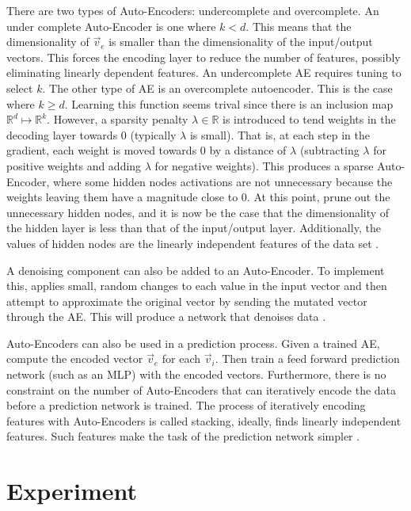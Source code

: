 \documentclass[twoside,11pt]{article}
\begin{document}
	There are two types of Auto-Encoders: undercomplete and overcomplete. 
	An under complete Auto-Encoder is one where $k < d$. This means that the dimensionality of $\vec{v}_e$ is smaller than the dimensionality of the input/output vectors. 
	This forces the encoding layer to reduce the number of features, possibly eliminating linearly dependent features. 
	An undercomplete AE requires tuning to select $k$.
	The other type of AE is an overcomplete autoencoder. This is the case where $k \geq d$.
	Learning this function seems trival since there is an inclusion map $\mathbb{R}^d \mapsto \mathbb{R}^k$.
	However, a sparsity penalty $\lambda \in \mathbb{R}$ is introduced to tend weights in the decoding layer towards 0 (typically $\lambda$ is small).
	That is, at each step in the gradient, each weight is moved towards 0 by a distance of $\lambda$ (subtracting $\lambda$ for positive weights and adding $\lambda$ for negative weights).
	This produces a sparse Auto-Encoder, where some hidden nodes activations are not unnecessary because the weights leaving them have a magnitude close to 0.
	At this point, prune out the unnecessary hidden nodes, and it is now be the case that the dimensionality of the hidden layer is less than that of the input/output layer.
	Additionally, the values of hidden nodes are the linearly independent features of the data set \citep{sparsity}.
	
	A denoising component can also be added to an Auto-Encoder. To implement this, applies small, random changes to each value in the input vector and then attempt to approximate the original vector by sending the mutated vector through the AE. This will produce a network that denoises data \citep{stacked-ae}.
	
	Auto-Encoders can also be used in a prediction process. Given a trained AE, compute the encoded vector  $\vec{v}_e$ for each $\vec{v}_i$. 
	Then train a feed forward prediction network (such as an MLP) with the encoded vectors. 
	Furthermore, there is no constraint on the number of Auto-Encoders that can iteratively encode the data before a prediction network is trained. 
	The process of iteratively encoding features with Auto-Encoders is called stacking, ideally, finds linearly independent features. Such features make the task of the prediction network simpler \citep{sparsity}.
		
\section{Experiment}
\end{document}
